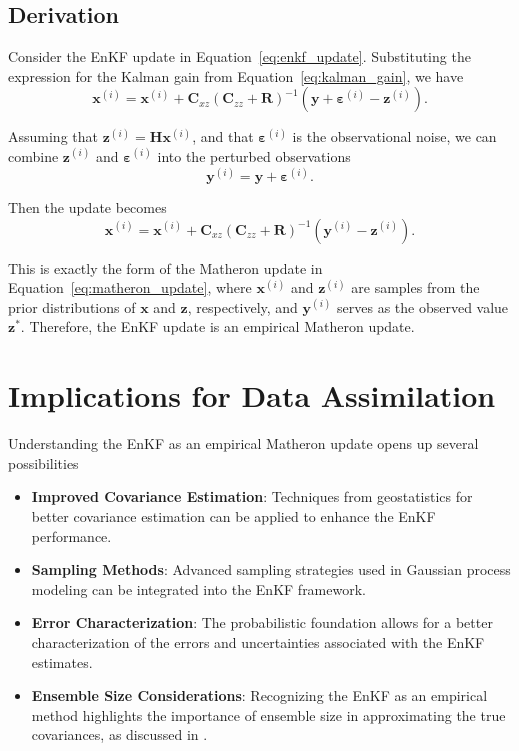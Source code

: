 \documentclass{article}
\begin{document}
\subsection{Derivation}

Consider the EnKF update in Equation~\eqref{eq:enkf_update}. Substituting the expression for the Kalman gain from Equation~\eqref{eq:kalman_gain}, we have
\begin{equation}
    \mathbf{x}^{(i)} = \mathbf{x}^{(i)} + \mathbf{C}_{xz} \left( \mathbf{C}_{zz} + \mathbf{R} \right)^{-1} \left( \mathbf{y} + \boldsymbol{\varepsilon}^{(i)} - \mathbf{z}^{(i)} \right).
    \label{eq:enkf_update_substituted}
\end{equation}

Assuming that $\mathbf{z}^{(i)} = \mathbf{H} \mathbf{x}^{(i)}$, and that $\boldsymbol{\varepsilon}^{(i)}$ is the observational noise, we can combine $\mathbf{z}^{(i)}$ and $\boldsymbol{\varepsilon}^{(i)}$ into the perturbed observations
\begin{equation}
    \mathbf{y}^{(i)} = \mathbf{y} + \boldsymbol{\varepsilon}^{(i)}.
\end{equation}

Then the update becomes
\begin{equation}
    \mathbf{x}^{(i)} = \mathbf{x}^{(i)} + \mathbf{C}_{xz} \left( \mathbf{C}_{zz} + \mathbf{R} \right)^{-1} \left( \mathbf{y}^{(i)} - \mathbf{z}^{(i)} \right).
    \label{eq:enkf_matheron}
\end{equation}

This is exactly the form of the Matheron update in Equation~\eqref{eq:matheron_update}, where $\mathbf{x}^{(i)}$ and $\mathbf{z}^{(i)}$ are samples from the prior distributions of $\mathbf{x}$ and $\mathbf{z}$, respectively, and $\mathbf{y}^{(i)}$ serves as the observed value $\mathbf{z}^*$. Therefore, the EnKF update is an empirical Matheron update.

\section{Implications for Data Assimilation}

Understanding the EnKF as an empirical Matheron update opens up several possibilities

\begin{itemize}
    \item \textbf{Improved Covariance Estimation}: Techniques from geostatistics for better covariance estimation can be applied to enhance the EnKF performance.
    \item \textbf{Sampling Methods}: Advanced sampling strategies used in Gaussian process modeling can be integrated into the EnKF framework.
    \item \textbf{Error Characterization}: The probabilistic foundation allows for a better characterization of the errors and uncertainties associated with the EnKF estimates.
    \item \textbf{Ensemble Size Considerations}: Recognizing the EnKF as an empirical method highlights the importance of ensemble size in approximating the true covariances, as discussed in \citet{Fearnhead2018Particle}.
\end{itemize}
\end{document}
